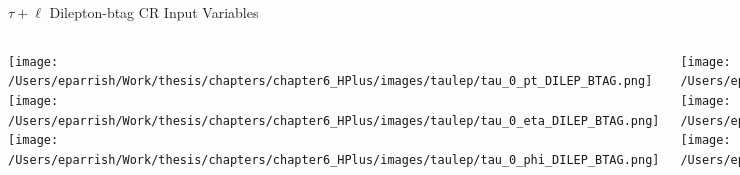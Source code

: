 \documentclass[aspectratio=169,xcolor=table]{beamer}
\begin{document}
    \begin{frame}[t]{$\tau+\ell$ Dilepton-btag CR Input Variables}
      \begin{columns}[t]
          \texttt{[image: /Users/eparrish/Work/thesis/chapters/chapter6\_HPlus/images/taulep/tau\_0\_pt\_DILEP\_BTAG.png]}
          \texttt{[image: /Users/eparrish/Work/thesis/chapters/chapter6\_HPlus/images/taulep/tau\_0\_eta\_DILEP\_BTAG.png]}
          \texttt{[image: /Users/eparrish/Work/thesis/chapters/chapter6\_HPlus/images/taulep/tau\_0\_phi\_DILEP\_BTAG.png]}

          \texttt{[image: /Users/eparrish/Work/thesis/chapters/chapter6\_HPlus/images/taulep/met\_et\_DILEP\_BTAG.png]}
          \texttt{[image: /Users/eparrish/Work/thesis/chapters/chapter6\_HPlus/images/taulep/met\_phi\_DILEP\_BTAG.png]}
          \texttt{[image: /Users/eparrish/Work/thesis/chapters/chapter6\_HPlus/images/taulep/jet\_1\_pt\_DILEP\_BTAG.png]}

          \texttt{[image: /Users/eparrish/Work/thesis/chapters/chapter6\_HPlus/images/taulep/bjet\_0\_pt\_DILEP\_BTAG.png]}
          \texttt{[image: /Users/eparrish/Work/thesis/chapters/chapter6\_HPlus/images/taulep/bjet\_0\_eta\_DILEP\_BTAG.png]}
          \texttt{[image: /Users/eparrish/Work/thesis/chapters/chapter6\_HPlus/images/taulep/bjet\_0\_phi\_DILEP\_BTAG.png]}

          \texttt{[image: /Users/eparrish/Work/thesis/chapters/chapter6\_HPlus/images/taulep/tau\_0\_upsilon\_DILEP\_BTAG.png]}
          \texttt{[image: /Users/eparrish/Work/thesis/chapters/chapter6\_HPlus/images/taulep/tau\_0\_charged\_tracks\_0\_pt\_DILEP\_BTAG.png]}

      \end{columns}
    \end{frame}
\end{document}

